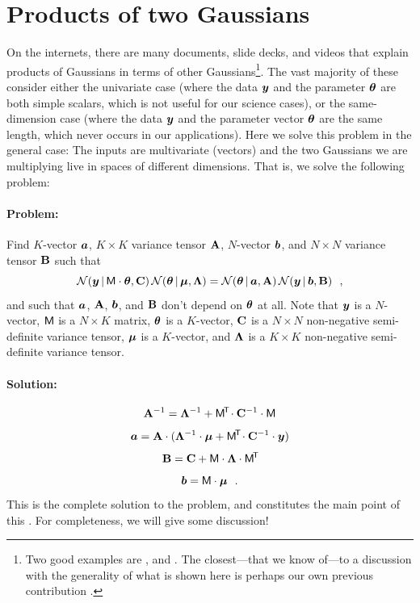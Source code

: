 \section{Products of two Gaussians}\label{sec:problemsolution}

On the internets, there are many documents, slide decks, and videos
that explain products of Gaussians in terms of other Gaussians\footnote{Two
  good examples are \cite{roweis}, and \cite{cookbook}. The closest---that we know
  of---to a 
  discussion with the generality of
  what is shown here is perhaps our own previous contribution \cite{luger}.}.
The vast majority of these consider either the univariate case (where
the data $\boldsymbol{y}$ and the parameter $\boldsymbol{\theta}$ are both simple scalars, which
is not useful for our science cases), or the same-dimension case (where the data
$\boldsymbol{y}$ and the parameter vector $\boldsymbol{\theta}$ are the same length, which never
occurs in our applications).
Here we solve this problem in the general case:
The inputs are multivariate (vectors) and the two Gaussians we are
multiplying live in spaces of different dimensions.
That is, we solve the following problem:

\paragraph{Problem:}
Find $K$-vector $\boldsymbol{a}$, $K\times K$ variance tensor $\mathbf{A}$, $N$-vector $\boldsymbol{b}$,
and $N\times N$ variance tensor $\mathbf{B}$ such that
\begin{equation}\label{eq:problem}
\mathcal{N}\!\,(\boldsymbol{y}\,|\,\mathsf{M}\cdot\boldsymbol{\theta},\mathbf{C})\,\mathcal{N}\!\,(\boldsymbol{\theta}\,|\,\boldsymbol{\mu},\mathbf{\Lambda})
 = \mathcal{N}\!\,(\boldsymbol{\theta}\,|\,\boldsymbol{a},\mathbf{A})\,\mathcal{N}\!\,(\boldsymbol{y}\,|\,\boldsymbol{b},\mathbf{B}) ~~,
\end{equation}
and such that $\boldsymbol{a}$, $\mathbf{A}$, $\boldsymbol{b}$, and $\mathbf{B}$ don't depend on $\boldsymbol{\theta}$ at all.
Note that
$\boldsymbol{y}$ is a $N$-vector,
$\mathsf{M}$ is a $N\times K$ matrix,
$\boldsymbol{\theta}$ is a $K$-vector,
$\mathbf{C}$ is a $N\times N$ non-negative semi-definite variance tensor,
$\boldsymbol{\mu}$ is a $K$-vector,
and
$\mathbf{\Lambda}$ is a $K\times K$ non-negative semi-definite variance tensor.

\paragraph{Solution:}
\begin{equation}\label{eq:A}
\mathbf{A}^{-1} = \mathbf{\Lambda}^{-1} + \mathsf{M}^{\!\mathsf{T}\!} \cdot \mathbf{C}^{-1} \cdot \mathsf{M}
\end{equation}
\begin{equation}\label{eq:a}
\boldsymbol{a} = \mathbf{A} \cdot (\mathbf{\Lambda}^{-1} \cdot \boldsymbol{\mu} + \mathsf{M}^{\!\mathsf{T}\!} \cdot \mathbf{C}^{-1} \cdot \boldsymbol{y})
\end{equation}
\begin{equation}\label{eq:B}
\mathbf{B} = \mathbf{C} + \mathsf{M} \cdot \mathbf{\Lambda} \cdot \mathsf{M}^{\!\mathsf{T}\!}
\end{equation}
\begin{equation}\label{eq:b}
\boldsymbol{b} = \mathsf{M} \cdot \boldsymbol{\mu}
~~.
\end{equation}
This is the complete solution to the problem, and constitutes the main point
of this \documentname.
For completeness, we will give some discussion!

